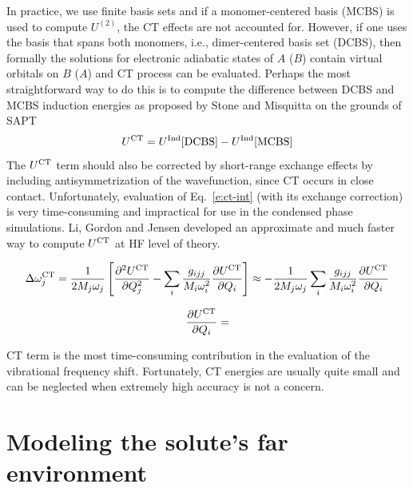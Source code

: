\documentclass[a4paper,titlepage,twoside,fleqn,12pt]{book}
\newcommand{\fderiv}[2]{\ensuremath{
\frac{\partial #1}{\partial #2}}}
\newcommand{\sderiv}[2]{\ensuremath{
\frac{\partial^2 #1}{\partial #2^2}
}}
\begin{document}
\begin{refsection}
In practice, 
we use finite basis sets and if a monomer\hyp{}centered basis (MCBS)
is used to compute $U^{(2)}$, the CT effects are not accounted for.
However, if one uses the basis that spans both monomers, i.e., 
dimer\hyp{}centered basis set (DCBS), then
formally the solutions for electronic adiabatic states of $A$ ($B$) contain
virtual orbitals on $B$ ($A$) and CT process can be evaluated.
Perhaps the most straightforward way to do this is to compute
the difference between DCBS and MCBS induction energies as proposed 
by Stone and Misquitta\citep{Stone.Misquitta.CPL.2009}
on the grounds of SAPT\citep{Jeziorski.Moszynski.Szalewicz.ChemRev.1994}
%
\begin{equation} \label{e:ct-int}
 U^{\rm CT} = U^{\rm Ind}[{\rm DCBS}] - U^{\rm Ind}[{\rm MCBS}]
\end{equation}
%
The $U^{\rm CT}$ term should also be corrected by short\hyp{}range
exchange effects by including antisymmetrization of the
wavefunction,\citep{Stone.Misquitta.CPL.2009} since CT occurs 
in close contact.
Unfortunately, evaluation of Eq.~\eqref{e:ct-int} (with its 
exchange correction) is very
time\hyp{}consuming and impractical for use in the condensed
phase simulations. Li, Gordon and Jensen developed
an approximate and much faster way to compute $U^{\rm CT}$
at HF level of theory.\citep{Li.Gordon.Jensen.JCP.2006}


\begin{equation} \label{e:dw-ct}
\Delta \omega_j^{\rm CT} =
\frac{1}{2M_j\omega_j} \left[ 
\sderiv{U^{\rm CT}}{Q_j} -
\sum_i \frac{g_{ijj}}{M_i\omega_i^2}\fderiv{U^{\rm CT}}{Q_i}
\right]
\approx 
-\frac{1}{2M_j\omega_j}\sum_i \frac{g_{ijj}}{M_i\omega_i^2}\fderiv{U^{\rm CT}}{Q_i}
\end{equation}

\begin{equation} \label{e:force-ct}
 \fderiv{U^{\rm CT}}{Q_i} = 
\end{equation}

CT term is the most time\hyp{}consuming contribution
in the evaluation of the vibrational frequency shift.
Fortunately, CT energies are usually quite small
and can be neglected when extremely high accuracy is not
a concern.

\section{Modeling the solute's far environment}


\end{refsection}
\end{document}
